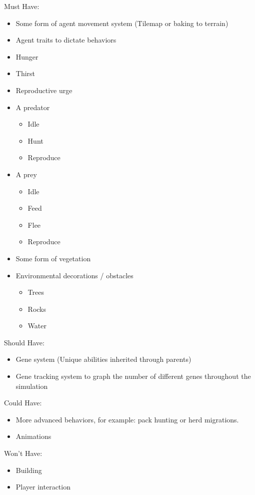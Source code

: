 \documentclass[a4paper, oneside, 11pt]{report}
\begin{document}
Must Have: 
\begin{itemize}
	\item{Some form of agent movement system (Tilemap or baking to terrain)}
	\item{Agent traits to dictate behaviors}
	\item{Hunger }
	\item{Thirst }
	\item{Reproductive urge}
	\item{A predator}
	\begin{itemize}
		\item{Idle}
		\item{Hunt}
		\item{Reproduce}
	\end{itemize}

	\item{A prey}
	\begin{itemize}
		\item{Idle}
		\item{Feed}
		\item{Flee}
		\item{Reproduce}
	\end{itemize}
		
	\item{Some form of vegetation}
	\item{Environmental decorations / obstacles}
	\begin{itemize}
		\item{Trees}
		\item{Rocks}
		\item{Water}
	\end{itemize}

\end{itemize}

Should Have: 
\begin{itemize}
	\item{Gene system (Unique abilities inherited through parents)}
	\item{Gene tracking system to graph the number of different genes throughout the simulation}
\end{itemize}

Could Have: 
\begin{itemize}
	\item{More advanced behaviors, for example: pack hunting or herd migrations.}
	\item{Animations}
\end{itemize}

Won’t Have: 
\begin{itemize}
	\item{Building}
	\item{Player interaction}
\end{itemize}
\end{document}
